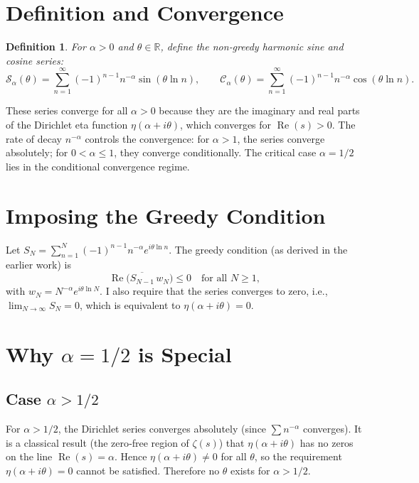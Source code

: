 \documentclass[12pt,a4paper]{article}
\newtheorem{definition}{Definition}
\begin{document}
\section{Definition and Convergence}

\begin{definition}
For $\alpha>0$ and $\theta\in\mathbb{R}$, define the non‑greedy harmonic sine and cosine series:
\[
\mathcal{S}_\alpha(\theta)=\sum_{n=1}^\infty (-1)^{n-1} n^{-\alpha} \sin(\theta\ln n),\qquad
\mathcal{C}_\alpha(\theta)=\sum_{n=1}^\infty (-1)^{n-1} n^{-\alpha} \cos(\theta\ln n).
\]
\end{definition}

These series converge for all $\alpha>0$ because they are the imaginary and real parts of the Dirichlet eta function $\eta(\alpha+i\theta)$, which converges for $\operatorname{Re}(s)>0$. The rate of decay $n^{-\alpha}$ controls the convergence: for $\alpha>1$, the series converge absolutely; for $0<\alpha\le1$, they converge conditionally. The critical case $\alpha=1/2$ lies in the conditional convergence regime.

\section{Imposing the Greedy Condition}

Let $S_N = \sum_{n=1}^N (-1)^{n-1} n^{-\alpha} e^{i\theta\ln n}$. The greedy condition (as derived in the earlier work) is
\[
\operatorname{Re}\bigl(\overline{S_{N-1}} \, w_N\bigr) \le 0 \quad \text{for all } N\ge1,
\]
with $w_N = N^{-\alpha} e^{i\theta\ln N}$. I also require that the series converges to zero, i.e., $\lim_{N\to\infty} S_N = 0$, which is equivalent to $\eta(\alpha+i\theta)=0$.

\section{Why $\alpha=1/2$ is Special}

\subsection{Case $\alpha>1/2$}
For $\alpha>1/2$, the Dirichlet series converges absolutely (since $\sum n^{-\alpha}$ converges). It is a classical result (the zero‑free region of $\zeta(s)$) that $\eta(\alpha+i\theta)$ has no zeros on the line $\operatorname{Re}(s)=\alpha$. Hence $\eta(\alpha+i\theta)\neq0$ for all $\theta$, so the requirement $\eta(\alpha+i\theta)=0$ cannot be satisfied. Therefore no $\theta$ exists for $\alpha>1/2$.
\end{document}
